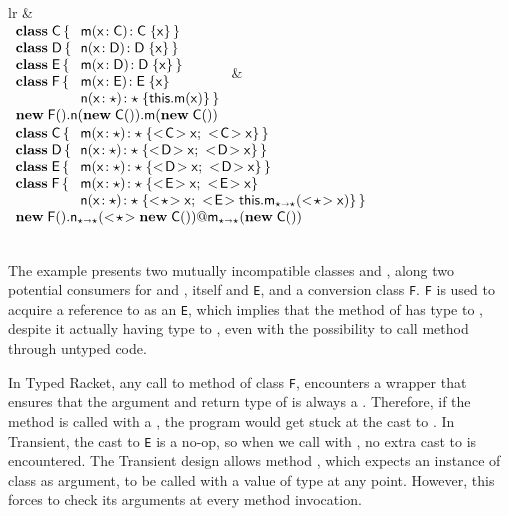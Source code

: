 \documentclass{tex/llncs}
\newcommand{\code}[1]{{\tt #1}\xspace}
\begin{document}
\newcommand{\sspce}{;~}
\newcommand{\idbody}[1]{\SubCast{#1}\x\sspce \SubCast{#1}\x}
\begin{tabular}{lr}
 &  \\
\footnotesize
\(
\begin{array}{l@{\,}l}
\Class\C{}{&\Mdef\m\x\C\C\x} \\
\Class\D{}{&\Mdef{\xt n}\x\D\D\x} \\
\Class{\xt E}{}{&\Mdef\m\x\D\D\x} \\
\Class{\xt F}{}{&\Mdef\m\x{\xt E}{\xt E}\x \\
                &\Mdef\n\x\any\any{\Call\this\m\x}} \\
\multicolumn{2}{l}{\Call{\Call{\New{\xt F}{}}\n{\New\C{}}}\m{\New\C{}}}
\end{array}
\) &
\footnotesize
\(
\begin{array}{l@{\,}l}
\Class\C{}{&\Mdef\m\x\any\any{\idbody\C}} \\
\Class\D{}{&\Mdef{\xt n}\x\any\any{\idbody\D}} \\
\Class{\xt E}{}{&\Mdef\m\x\any\any{\idbody\D}} \\
\Class{\xt F}{}{&\Mdef\m\x\any\any{\idbody{\xt E}} \\
                &\Mdef\n\x\any\any{\SubCast{\any}{\x}\sspce 
                \SubCast{\xt E}{\KCall\this\m{\SubCast\any\x}\any\any}}} \\
\multicolumn{2}{l}{\DynCall{\KCall{\New{\xt F}{}}\n{\SubCast\any{\New\C{}}}\any\any}\m{\New\C{}}}
\end{array}
\)
\end{tabular} \\[1em]

The example presents two mutually incompatible classes \C and \D,
along two potential consumers for \C and \D, \C itself and \code E,
and a conversion class \code F. \code F is used to acquire a
reference to \C as an \code E, which implies that the method \m of \C has type \D to
\D, despite it actually having type \C to \C, even with the possibility to call
method \m through untyped code.

In Typed Racket, any call to method \m of class \code F, encounters a
wrapper that ensures that the argument and return type of \m is always a
\D. Therefore, if the method \m is called with a \C, the program would get
stuck at the cast to \D. In Transient, the cast to \code E is a no-op, so
when we call \m with \C, no extra cast to \D is encountered. The Transient
design allows method \m, which expects an instance of class \C as argument,
to be called with a value of type \any at any point. However, this forces \m
to check its arguments at every method invocation.
\end{document}
